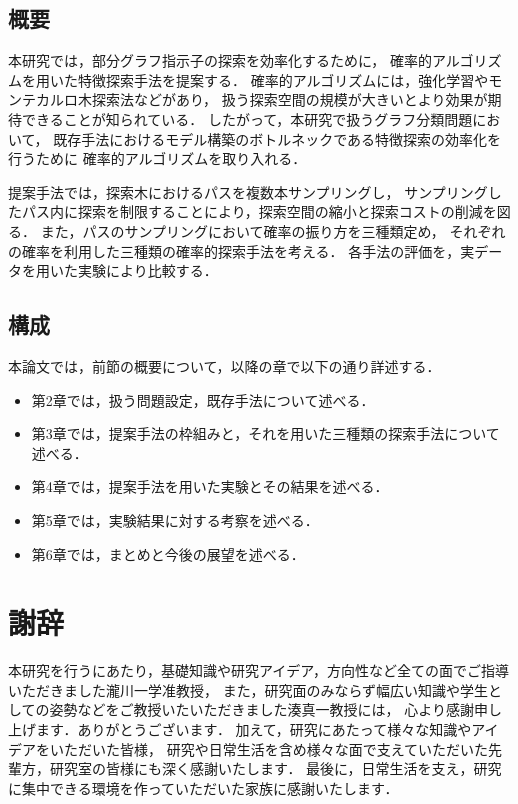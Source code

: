 \documentclass[12pt,fleqn]{jsotsuron}
\begin{document}
\section{概要}
本研究では，部分グラフ指示子の探索を効率化するために，
確率的アルゴリズムを用いた特徴探索手法を提案する．
確率的アルゴリズムには，強化学習やモンテカルロ木探索法\cite{MCTS}などがあり，
扱う探索空間の規模が大きいとより効果が期待できることが知られている．
したがって，本研究で扱うグラフ分類問題において，
既存手法におけるモデル構築のボトルネックである特徴探索の効率化を行うために
確率的アルゴリズムを取り入れる．

提案手法では，探索木におけるパスを複数本サンプリングし，
サンプリングしたパス内に探索を制限することにより，探索空間の縮小と探索コストの削減を図る．
また，パスのサンプリングにおいて確率の振り方を三種類定め，
それぞれの確率を利用した三種類の確率的探索手法を考える．
各手法の評価を，実データを用いた実験により比較する．

\section{構成}
本論文では，前節の概要について，以降の章で以下の通り詳述する．
\begin{itemize}
\item 第2章では，扱う問題設定，既存手法について述べる．
\item 第3章では，提案手法の枠組みと，それを用いた三種類の探索手法について述べる．
\item 第4章では，提案手法を用いた実験とその結果を述べる．
\item 第5章では，実験結果に対する考察を述べる．
\item 第6章では，まとめと今後の展望を述べる．
\end{itemize}




\chapter*{謝辞}
本研究を行うにあたり，基礎知識や研究アイデア，方向性など全ての面でご指導いただきました瀧川一学准教授，
また，研究面のみならず幅広い知識や学生としての姿勢などをご教授いたいただきました湊真一教授には，
心より感謝申し上げます．ありがとうございます．
加えて，研究にあたって様々な知識やアイデアをいただいた皆様，
研究や日常生活を含め様々な面で支えていただいた先輩方，研究室の皆様にも深く感謝いたします．
最後に，日常生活を支え，研究に集中できる環境を作っていただいた家族に感謝いたします．


\end{document}

